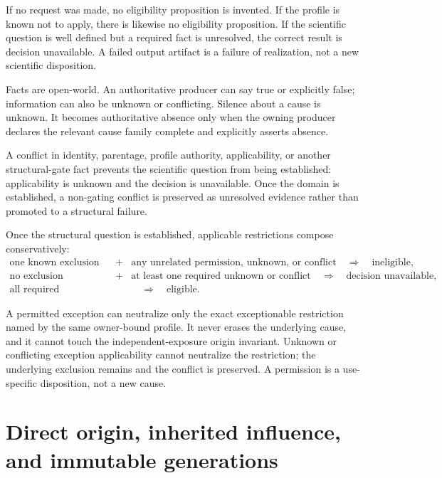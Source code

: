 \documentclass[10pt]{article}
\begin{document}
If no request was made, no eligibility proposition is invented. If the
profile is known not to apply, there is likewise no eligibility proposition.
If the scientific question is well defined but a required fact is unresolved,
the correct result is decision unavailable. A failed output artifact is a
failure of realization, not a new scientific disposition.

Facts are open-world. An authoritative producer can say true or explicitly
false; information can also be unknown or conflicting. Silence about a cause
is unknown. It becomes authoritative absence only when the owning producer
declares the relevant cause family complete and explicitly asserts absence.

A conflict in identity, parentage, profile authority, applicability, or
another structural-gate fact prevents the scientific question from being
established: applicability is unknown and the decision is unavailable. Once
the domain is established, a non-gating conflict is preserved as unresolved
evidence rather than promoted to a structural failure.

Once the structural question is established, applicable restrictions compose
conservatively:
\[
\begin{array}{ccl}
\text{one known exclusion} &+& \text{any unrelated permission, unknown, or conflict}
\quad\Longrightarrow\quad \text{ineligible},\\[0.2em]
\text{no exclusion} &+& \text{at least one required unknown or conflict}
\quad\Longrightarrow\quad \text{decision unavailable},\\[0.2em]
\text{all required permissions known} &&
\quad\Longrightarrow\quad \text{eligible}.
\end{array}
\]

A permitted exception can neutralize only the exact exceptionable restriction
named by the same owner-bound profile. It never erases the underlying cause,
and it cannot touch the independent-exposure origin invariant. Unknown or
conflicting exception applicability cannot neutralize the restriction; the
underlying exclusion remains and the conflict is preserved. A permission is a
use-specific disposition, not a new cause.

\clearpage
\section{Direct origin, inherited influence, and immutable generations}
\label{sec:rat-influence}
\end{document}
